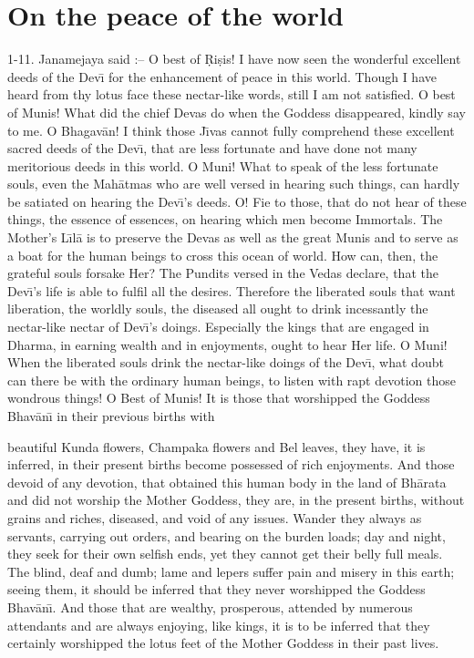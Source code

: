 \chapter{On the peace of the world}

1-11. Janamejaya said :-- O best of \d{R}i\d{s}is! I have now seen the wonderful excellent deeds of the Dev\={\i} for the enhancement of peace in this world. Though I have heard from thy lotus face these nectar-like words, still I am not satisfied. O best of Munis! What did the chief Devas do when the Goddess disappeared, kindly say to me. O Bhagav\=an! I think those J\={\i}vas cannot fully comprehend these excellent sacred deeds of the Dev\={\i}, that are less fortunate and have done not many meritorious deeds in this world. O Muni! What to speak of the less fortunate souls, even the Mah\=atmas who are well versed in hearing such things, can hardly be satiated on hearing the Dev\={\i}'s deeds. O! Fie to those, that do not hear of these things, the essence of essences, on hearing which men become Immortals. The Mother's L\={\i}l\=a is to preserve the Devas as well as the great Munis and to serve as a boat for the human beings to cross this ocean of world. How can, then, the grateful souls forsake Her? The Pundits versed in the Vedas declare, that the Dev\={\i}'s life is able to fulfil all the desires. Therefore the liberated souls that want liberation, the worldly souls, the diseased all ought to drink incessantly the nectar-like nectar of Dev\={\i}'s doings. Especially the kings that are engaged in Dharma, in earning wealth and in enjoyments, ought to hear Her life. O Muni! When the liberated souls drink the nectar-like doings of the Dev\={\i}, what doubt can there be with the ordinary human beings, to listen with rapt devotion those wondrous things! O Best of Munis! It is those that worshipped the Goddess Bhav\=an\={\i} in their previous births with

beautiful Kunda flowers, Champaka flowers and Bel leaves, they have, it is inferred, in their present births become possessed of rich enjoyments. And those devoid of any devotion, that obtained this human body in the land of Bh\=arata and did not worship the Mother Goddess, they are, in the present births, without grains and riches, diseased, and void of any issues. Wander they always as servants, carrying out orders, and bearing on the burden loads; day and night, they seek for their own selfish ends, yet they cannot get their belly full meals. The blind, deaf and dumb; lame and lepers suffer pain and misery in this earth; seeing them, it should be inferred that they never worshipped the Goddess Bhav\=an\={\i}. And those that are wealthy, prosperous, attended by numerous attendants and are always enjoying, like kings, it is to be inferred that they certainly worshipped the lotus feet of the Mother Goddess in their past lives.

